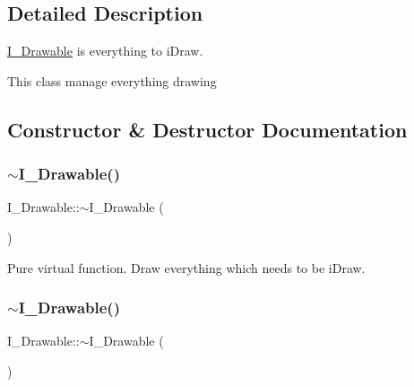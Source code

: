 \subsection{Detailed Description}
\hyperlink{classI__Drawable}{I\+\_\+\+Drawable} is everything to i\+Draw. 

This class manage everything drawing 

\subsection{Constructor \& Destructor Documentation}
\mbox{\label{classI__Drawable_a80bfc9f76ccdded97cbcf446d4ace774}} 
\subsubsection{\texorpdfstring{$\sim$\+I\+\_\+\+Drawable()}{~I\_Drawable()}\hspace{0.1cm}{\footnotesize\ttfamily [1/2]}}
{\footnotesize\ttfamily I\+\_\+\+Drawable\+::$\sim$\+I\+\_\+\+Drawable (\begin{DoxyParamCaption}{ }\end{DoxyParamCaption})\hspace{0.3cm}{\ttfamily [default]}}



Pure virtual function. Draw everything which needs to be i\+Draw. 

\mbox{\label{classI__Drawable_a80bfc9f76ccdded97cbcf446d4ace774}} 
\subsubsection{\texorpdfstring{$\sim$\+I\+\_\+\+Drawable()}{~I\_Drawable()}\hspace{0.1cm}{\footnotesize\ttfamily [2/2]}}
{\footnotesize\ttfamily I\+\_\+\+Drawable\+::$\sim$\+I\+\_\+\+Drawable (\begin{DoxyParamCaption}{ }\end{DoxyParamCaption})\hspace{0.3cm}{\ttfamily [default]}}



